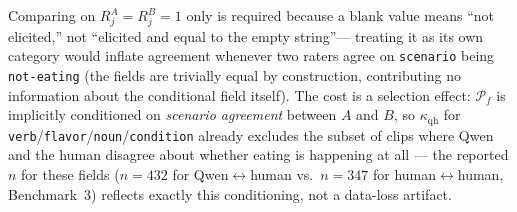 \begin{remark}
Comparing on $R^A_j = R^B_j = 1$ only is required because a blank value
means ``not elicited,'' not ``elicited and equal to the empty
string''--- treating it as its own category would inflate agreement
whenever two raters agree on \texttt{scenario} being \texttt{not-eating}
(the fields are trivially equal by construction, contributing no
information about the conditional field itself). The cost is a
selection effect: $\mathcal{P}_f$ is implicitly conditioned on
\emph{scenario agreement} between $A$ and $B$, so $\kappa_{\mathrm{qh}}$
for \texttt{verb}/\texttt{flavor}/\texttt{noun}/\texttt{condition}
already excludes the subset of clips where Qwen and the human disagree
about whether eating is happening at all --- the reported $n$ for these
fields ($n{=}432$ for Qwen$\leftrightarrow$human vs.\ $n{=}347$ for
human$\leftrightarrow$human, Benchmark~3) reflects exactly this
conditioning, not a data-loss artifact.
\end{remark}
